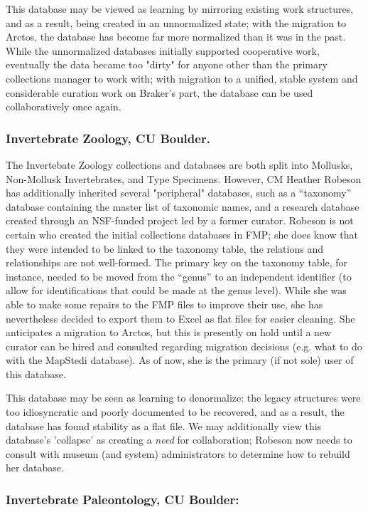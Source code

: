 This database may be viewed as learning by mirroring existing work structures, and as a result, being created in an unnormalized state; with the migration to Arctos, the database has become far more normalized than it was in the past. While the unnormalized databases initially supported cooperative work, eventually the data became too "dirty" for anyone other than the primary collections manager to work with; with migration to a unified, stable system and considerable curation work on Braker's part, the database can be used collaboratively once again.

\subsubsection{Invertebrate Zoology, CU Boulder.}

The Invertebate Zoology collections and databases are both split into Mollusks, Non-Mollusk Invertebrates, and Type Specimens. However, CM Heather Robeson has additionally inherited several "peripheral" databases, such as a “taxonomy” database containing the master list of taxonomic names, and a research database created through an NSF-funded project led by a former curator. Robeson is not certain who created the initial collections databases in FMP; she does know that they were intended to be linked to the taxonomy table, the relations and relationships are not well-formed. The primary key on the taxonomy table, for instance, needed to be moved from the “genus” to an independent identifier (to allow for identifications that could be made at the genus level). While she was able to make some repairs to the FMP files to improve their use, she has nevertheless decided to export them to Excel as flat files for easier cleaning.  She anticipates a migration to Arctos, but this is presently on hold until a new curator can be hired and consulted regarding migration decisions (e.g. what to do with the MapStedi database).  As of now, she is the primary (if not sole) user of this database.

This database may be seen as learning to denormalize: the legacy structures were too idiosyncratic and poorly documented to be recovered, and as a result, the database has found stability as a flat file. We may additionally view this database's 'collapse' as creating a \textit{need} for collaboration; Robeson now needs to consult with museum (and system) administrators to determine how to rebuild her database.

\subsubsection{Invertebrate Paleontology, CU Boulder:}

